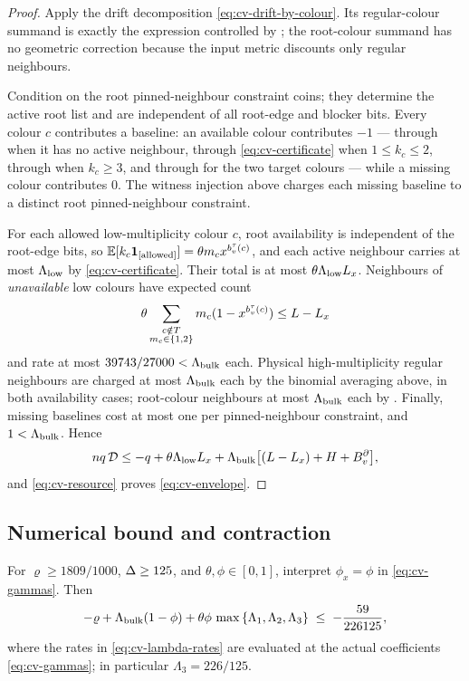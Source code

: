 \begin{proof}
Apply the drift decomposition \eqref{eq:cv-drift-by-colour}.  Its regular-colour
summand is exactly the expression controlled by
; the root-colour summand has no
geometric correction because the input metric discounts only regular
neighbours.

Condition on the root pinned-neighbour constraint coins; they determine the active
root list and are independent of all root-edge and blocker bits.
Every colour \(c\) contributes a baseline: an available colour contributes $-1$
--- through  when
it has no active neighbour, through \eqref{eq:cv-certificate}
when $1\le k_c\le2$, through  when $k_c\ge3$, and
through  for the two target colours --- while a
missing colour contributes $0$.  The witness injection above charges each
missing baseline to a distinct root pinned-neighbour constraint.

For each allowed low-multiplicity colour \(c\), root availability is independent of
the root-edge bits, so
$\operatorname{\mathbb{E}}[k_c\mathbf{1}_{\left[\text{allowed}\right]}]=\theta m_cx^{b_v^\tau(c)}$, and each active
neighbour carries at most $\Lambda_{\rm low}$ by
\eqref{eq:cv-certificate}.  Their total is at most
$\theta\Lambda_{\rm low}L_x$. Neighbours of \emph{unavailable} low colours have expected
count
\[
 \theta\sum_{\substack{c\notin T\\m_c\in\left\{1,2\right\}}}
      m_c(1-x^{b_v^\tau(c)})\le L-L_x
\]
and rate at
most $39743/27000<\Lambda_{\rm bulk}$ each.  Physical
high-multiplicity regular neighbours are charged at most
$\Lambda_{\rm bulk}$ each by the binomial averaging above, in both
availability cases; root-colour neighbours at most $\Lambda_{\rm bulk}$
each by .  Finally, missing baselines cost at most one
per pinned-neighbour constraint, and $1<\Lambda_{\rm bulk}$. Hence
\[
  nq\,\mathcal D\le-q+\theta\Lambda_{\rm low}L_x
    +\Lambda_{\rm bulk}\bigl[(L-L_x)+H+B_v^{\partial}\bigr],
\]
and \eqref{eq:cv-resource} proves \eqref{eq:cv-envelope}.
\end{proof}

\subsection{Numerical bound and contraction}
\begin{lemma}\label{lem:cv-scalar}
For $\varrho\ge1809/1000$, $\Delta\ge125$, and
$\theta,\phi\in[0,1]$, interpret $\phi_x=\phi$ in
\eqref{eq:cv-gammas}. Then
\[
  -\varrho+\Lambda_{\rm bulk}(1-\phi)
    +\theta\phi\,\max\left\{\Lambda_1,\Lambda_2,\Lambda_3\right\}
  \;\le\;-\frac{59}{226125},
\]
where the rates in \eqref{eq:cv-lambda-rates} are evaluated at the actual
coefficients \eqref{eq:cv-gammas}; in particular
\(\Lambda_3=226/125\).
\end{lemma}

